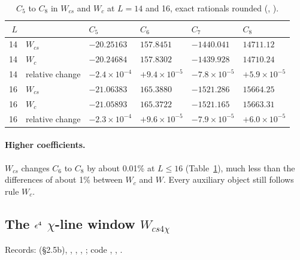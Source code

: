 \begin{table}[ht]
\centering\footnotesize\renewcommand{\arraystretch}{1.15}
\begin{tabular}{@{}rlllll@{}}
\toprule
$L$ & & $C_5$ & $C_6$ & $C_7$ & $C_8$ \\\midrule
14 & $W_{cs}$ & $-20.25163$ & $157.8451$ & $-1440.041$ & $14711.12$ \\
14 & $W_c$ & $-20.24684$ & $157.8302$ & $-1439.928$ & $14710.24$ \\
14 & relative change & $-2.4\times10^{-4}$ & $+9.4\times10^{-5}$ & $-7.8\times10^{-5}$ & $+5.9\times10^{-5}$ \\\midrule
16 & $W_{cs}$ & $-21.06383$ & $165.3880$ & $-1521.286$ & $15664.25$ \\
16 & $W_c$ & $-21.05893$ & $165.3722$ & $-1521.165$ & $15663.31$ \\
16 & relative change & $-2.3\times10^{-4}$ & $+9.6\times10^{-5}$ & $-7.9\times10^{-5}$ & $+6.0\times10^{-5}$ \\
\bottomrule
\end{tabular}
\caption{$C_5$ to $C_8$ in $W_{cs}$ and $W_c$ at $L=14$ and 16, exact rationals rounded (,
).}
\label{htp:d2:tab:wcsCn}
\end{table}

\paragraph{Higher coefficients.} $W_{cs}$ changes $C_6$ to $C_8$ by about 0.01\% at $L\le16$ (Table~\ref{htp:d2:tab:wcsCn}), much
less than the differences of about 1\% between $W_c$ and $W$. Every auxiliary object still follows rule $W_c$.

\subsection{The \texorpdfstring{$\epsilon^4$}{eps4} \texorpdfstring{$\chi$}{chi}-line window \texorpdfstring{$W_{cs4\chi}$}{Wcs4chi}}\label{htp:d2:app:wcs4chi}
{\small\raggedright\noindent Records:  (\S2.5b),
, , ,
; code
, ,
.\par}

